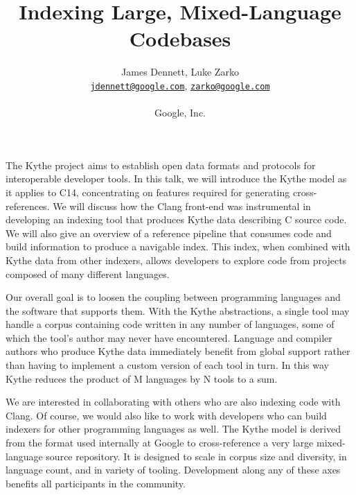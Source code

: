 \documentclass[10pt,letterpaper]{article}
\newcommand{\mailto}[1]{\href{mailto:#1}{\nolinkurl{#1}}}
\newcommand{\Rplus}{\protect\hspace{-.1em}\protect\raisebox{.35ex}{\smaller{\smaller\textbf{+}}}}
\newcommand{\Cpp}{\mbox{C\Rplus\Rplus}\xspace}
\newcommand{\Cyy}{\mbox{C\Rplus\Rplus}14\xspace}
\begin{document}
\title{Indexing Large, Mixed-Language Codebases}
\author{James Dennett, Luke Zarko\\
{\small\mailto{jdennett@google.com}, \mailto{zarko@google.com}}\\
\\
Google, Inc.}
\date{}
\maketitle
\thispagestyle{empty}

The Kythe project aims to establish open data formats and protocols for
interoperable developer tools. In this talk, we will introduce the Kythe model
as it applies to \Cyy, concentrating on features required for generating
cross-references. We will discuss how the Clang front-end was instrumental in
developing an indexing tool that produces Kythe data describing \Cpp source
code. We will also give an overview of a reference pipeline that consumes code
and build information to produce a navigable index. This index, when combined
with Kythe data from other indexers, allows developers to explore code from
projects composed of many different languages.

Our overall goal is to loosen the coupling between programming languages and
the software that supports them. With the Kythe abstractions, a single tool
may handle a corpus containing code written in any number of languages, some
of which the tool's author may never have encountered. Language and compiler
authors who produce Kythe data immediately benefit from global support rather
than having to implement a custom version of each tool in turn. In this way
Kythe reduces the product of M languages by N tools to a sum.

We are interested in collaborating with others who are also indexing code with
Clang. Of course, we would also like to work with developers who can build
indexers for other programming languages as well. The Kythe model is derived
from the format used internally at Google to cross-reference a very large
mixed-language source repository. It is designed to scale in corpus size and
diversity, in language count, and in variety of tooling. Development along any
of these axes benefits all participants in the community.
\end{document}
